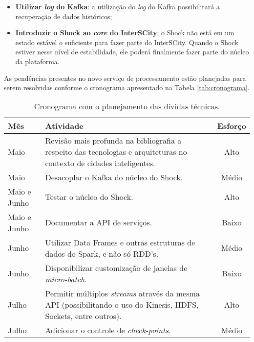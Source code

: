 \begin{itemize}
    \item \textbf{Utilizar \textit{log} do Kafka}: a utilização do \textit{log}
        do Kafka possibilitará a recuperação de dados históricos;

    \item \textbf{Introduzir o Shock ao \textit{core} do InterSCity}: o Shock
        não está em um estado estável o suficiente para fazer parte do
        InterSCity. Quando o Shock estiver nesse nível de estabilidade, ele
        poderá finalmente fazer parte do núcleo da plataforma.
\end{itemize}

As pendências
presentes no novo serviço de processamento estão planejadas para serem
resolvidas conforme o cronograma apresentado na Tabela \ref{tab:cronograma}.

\begin{table}[h]
  \begin{center}
  \caption{Cronograma com o planejamento das dívidas técnicas.}
    \begin{tabular}{|l| p{12cm}|c|}
        \hline \textbf{Mês} & \textbf{Atividade}  & \textbf{Esforço} \\

        \hline Maio & Revisão mais profunda na bibliografia a respeito das
        tecnologias e arquiteturas no contexto de cidades inteligentes. &
        Alto \\

        \hline Maio & Desacoplar o Kafka do núcleo do Shock. & Médio \\

        \hline Maio e Junho & Testar o núcleo do Shock. & Alto \\

        \hline Maio e Junho & Documentar a API de serviços. & Baixo \\

        \hline Junho & Utilizar Data Frames e outras estruturas de dados do
        Spark, e não só RDD's. & Médio \\

        \hline Junho & Disponibilizar customização de janelas de \textit{micro-batch}. & Baixo \\

        \hline Julho & Permitir múltiplos \textit{streams} através da mesma
        API (possibilitando o uso do Kinesis, HDFS, Sockets, entre outros).
          & Alto \\

        \hline Julho & Adicionar o controle de \textit{check-points}. 
            & Médio \\


\end{tabular}
\end{center}
\end{table}
